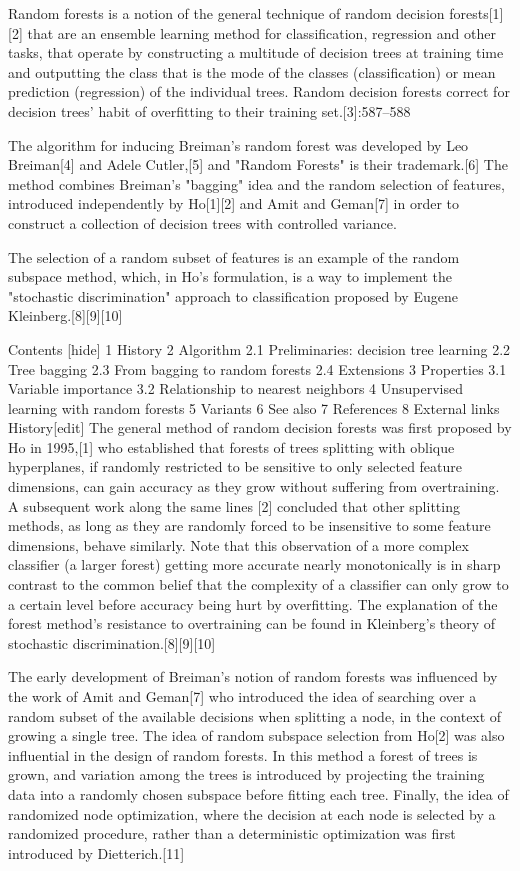 Random forests is a notion of the general technique of random decision forests[1][2] that are an ensemble learning method for classification, regression and other tasks, that operate by constructing a multitude of decision trees at training time and outputting the class that is the mode of the classes (classification) or mean prediction (regression) of the individual trees. Random decision forests correct for decision trees' habit of overfitting to their training set.[3]:587–588

The algorithm for inducing Breiman's random forest was developed by Leo Breiman[4] and Adele Cutler,[5] and "Random Forests" is their trademark.[6] The method combines Breiman's "bagging" idea and the random selection of features, introduced independently by Ho[1][2] and Amit and Geman[7] in order to construct a collection of decision trees with controlled variance.

The selection of a random subset of features is an example of the random subspace method, which, in Ho's formulation, is a way to implement the "stochastic discrimination" approach to classification proposed by Eugene Kleinberg.[8][9][10]

Contents  [hide] 
1	History
2	Algorithm
2.1	Preliminaries: decision tree learning
2.2	Tree bagging
2.3	From bagging to random forests
2.4	Extensions
3	Properties
3.1	Variable importance
3.2	Relationship to nearest neighbors
4	Unsupervised learning with random forests
5	Variants
6	See also
7	References
8	External links
History[edit]
The general method of random decision forests was first proposed by Ho in 1995,[1] who established that forests of trees splitting with oblique hyperplanes, if randomly restricted to be sensitive to only selected feature dimensions, can gain accuracy as they grow without suffering from overtraining. A subsequent work along the same lines [2] concluded that other splitting methods, as long as they are randomly forced to be insensitive to some feature dimensions, behave similarly. Note that this observation of a more complex classifier (a larger forest) getting more accurate nearly monotonically is in sharp contrast to the common belief that the complexity of a classifier can only grow to a certain level before accuracy being hurt by overfitting. The explanation of the forest method's resistance to overtraining can be found in Kleinberg's theory of stochastic discrimination.[8][9][10]

The early development of Breiman's notion of random forests was influenced by the work of Amit and Geman[7] who introduced the idea of searching over a random subset of the available decisions when splitting a node, in the context of growing a single tree. The idea of random subspace selection from Ho[2] was also influential in the design of random forests. In this method a forest of trees is grown, and variation among the trees is introduced by projecting the training data into a randomly chosen subspace before fitting each tree. Finally, the idea of randomized node optimization, where the decision at each node is selected by a randomized procedure, rather than a deterministic optimization was first introduced by Dietterich.[11]

